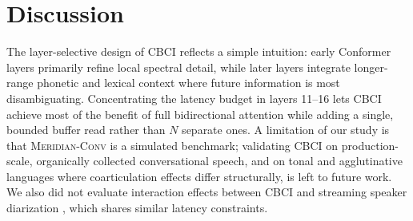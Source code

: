\section{Discussion}
The layer-selective design of CBCI reflects a simple intuition: early Conformer layers primarily refine
local spectral detail, while later layers integrate longer-range phonetic and lexical context where
future information is most disambiguating. Concentrating the latency budget in layers 11--16 lets CBCI
achieve most of the benefit of full bidirectional attention while adding a single, bounded buffer read
rather than $N$ separate ones. A limitation of our study is that \textsc{Meridian-Conv} is a simulated
benchmark; validating CBCI on production-scale, organically collected conversational speech, and on
tonal and agglutinative languages where coarticulation effects differ structurally, is left to future
work. We also did not evaluate interaction effects between CBCI and streaming speaker diarization
\citep{kowalski2022diarization}, which shares similar latency constraints.
